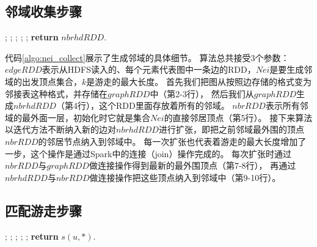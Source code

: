 \documentclass[master]{njuthesis}
\begin{document}
\subsection{邻域收集步骤}
\begin{algorithm}[h]
\label{algo:nei_collect}
\begin{algorithmic}[1]
		;
		;
		;
			;
			;
		\EndFor
	\State \textbf{return} $nbrhdRDD$.
	\EndProcedure
\end{algorithmic}
\end{algorithm}
代码\ref{algo:nei_collect}展示了生成邻域的具体细节。
算法总共接受3个参数：$edgeRDD$表示从HDFS读入的、每个元素代表图中一条边的RDD，$Nei$是要生成邻域的出发顶点集合，$k$是游走的最大长度。
首先我们把图从按照边存储的格式变为邻接表这种格式，并存储在$graphRDD$中（第2-3行），
然后我们从$graphRDD$生成$nbrhdRDD$（第4行），这个RDD里面存放着所有的邻域。
$nbrRDD$表示所有邻域的最外面一层，初始化时它就是集合$Nei$的直接邻居顶点（第5行）。
接下来算法以迭代方法不断纳入新的边对$nbrhdRDD$进行扩张，即把之前邻域最外围的顶点$nbrRDD$的邻居节点纳入到邻域中。
每一次扩张也代表着游走的最大长度增加了一步，这个操作是通过Spark中的连接（join）操作完成的。
每次扩张时通过$nbrRDD$与$graphRDD$做连接操作得到最新的最外围顶点（第7-8行），
再通过$nbrhdRDD$与$nbrRDD$做连接操作把这些顶点纳入到邻域中（第9-10行）。

\subsection{匹配游走步骤}

\begin{algorithm}[h]
\label{algo:match}
\begin{algorithmic}[1]
	;
	;
	;
	;
	\State {\qquad $\})$}
	;
	\State \textbf{return} $s(u, *)$.
\EndProcedure
\end{algorithmic}
\end{algorithm}
\end{document}

